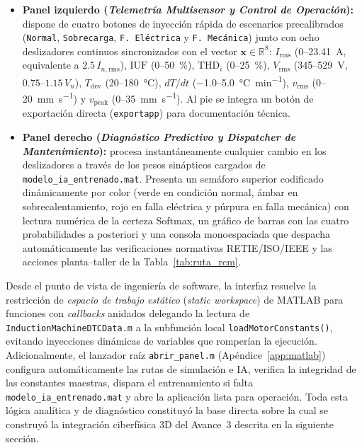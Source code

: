 \begin{itemize}\setlength{\itemsep}{2pt}\setlength{\topsep}{2pt}
    \item \textbf{Panel izquierdo (\emph{Telemetría Multisensor y Control de Operación}):} dispone de cuatro botones de inyección rápida de escenarios precalibrados (\texttt{Normal}, \texttt{Sobrecarga}, \texttt{F.~Eléctrica} y \texttt{F.~Mecánica}) junto con ocho deslizadores continuos sincronizados con el vector $\mathbf{x}\in\mathbb{R}^8$: $I_{\text{rms}}$ (\num{0}--\qty{23.41}{\ampere}, equivalente a $2.5\,I_{n,\text{rms}}$), $\text{IUF}$ (\num{0}--\qty{50}{\percent}), $\text{THD}_i$ (\num{0}--\qty{25}{\percent}), $V_{\text{rms}}$ (\num{345}--\qty{529}{\volt}, $0.75$--$1.15\,V_n$), $T_{\text{dev}}$ (\num{20}--\qty{180}{\celsius}), $dT/dt$ (\num{-1.0}--\qty{5.0}{\celsius\per\minute}), $v_{\text{rms}}$ (\num{0}--\qty{20}{\milli\meter\per\second}) y $v_{\text{peak}}$ (\num{0}--\qty{35}{\milli\meter\per\second}). Al pie se integra un botón de exportación directa (\texttt{exportapp}) para documentación técnica.
    \item \textbf{Panel derecho (\emph{Diagnóstico Predictivo y Dispatcher de Mantenimiento}):} procesa instantáneamente cualquier cambio en los deslizadores a través de los pesos sinápticos cargados de \texttt{modelo\_\allowbreak ia\_\allowbreak entrenado.mat}. Presenta un semáforo superior codificado dinámicamente por color (verde en condición normal, ámbar en sobrecalentamiento, rojo en falla eléctrica y púrpura en falla mecánica) con lectura numérica de la certeza Softmax, un gráfico de barras con las cuatro probabilidades a posteriori y una consola monoespaciada que despacha automáticamente las verificaciones normativas RETIE/ISO/IEEE y las acciones planta--taller de la Tabla~\ref{tab:ruta_rcm}.
\end{itemize}

Desde el punto de vista de ingeniería de software, la interfaz resuelve la restricción de \emph{espacio de trabajo estático} (\emph{static workspace}) de MATLAB para funciones con \emph{callbacks} anidados delegando la lectura de \texttt{Induction\allowbreak Machine\allowbreak DTC\allowbreak Data.m} a la subfunción local \texttt{load\allowbreak Motor\allowbreak Constants()}, evitando inyecciones dinámicas de variables que romperían la ejecución. Adicionalmente, el lanzador raíz \texttt{abrir\_panel.m} (Apéndice~\ref{app:matlab}) configura automáticamente las rutas de simulación e IA, verifica la integridad de las constantes maestras, dispara el entrenamiento si falta \texttt{modelo\_\allowbreak ia\_\allowbreak entrenado.mat} y abre la aplicación lista para operación. Toda esta lógica analítica y de diagnóstico constituyó la base directa sobre la cual se construyó la integración ciberfísica 3D del Avance~3 descrita en la siguiente sección.
